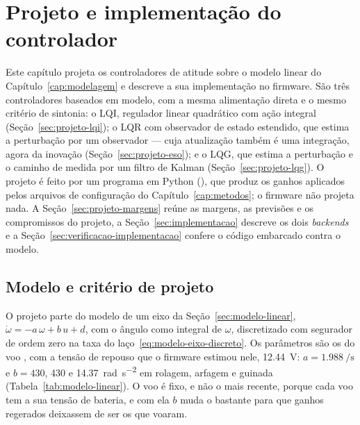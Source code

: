 %
\chapter{Projeto e implementação do controlador}
\label{cap:projeto}

Este capítulo projeta os controladores de atitude sobre o modelo linear do
Capítulo~\ref{cap:modelagem} e descreve a sua implementação no firmware. São
três controladores baseados em modelo, com a mesma alimentação direta e o
mesmo critério de sintonia: o LQI, regulador linear quadrático com ação
integral (Seção~\ref{sec:projeto-lqi}); o LQR com observador de estado
estendido, que estima a perturbação por um observador --- cuja atualização
também é uma integração, agora da inovação
(Seção~\ref{sec:projeto-eso}); e o LQG, que estima a perturbação e o caminho
de medida por um filtro de Kalman (Seção~\ref{sec:projeto-lqg}). O projeto é
feito por um programa em Python (), que produz
os ganhos aplicados pelos arquivos de configuração do
Capítulo~\ref{cap:metodos}; o firmware não projeta nada. A
Seção~\ref{sec:projeto-margens} reúne as margens, as previsões e os
compromissos do projeto, a Seção~\ref{sec:implementacao} descreve os dois
\textit{backends} e a Seção~\ref{sec:verificacao-implementacao} confere o
código embarcado contra o modelo.

\section{Modelo e critério de projeto}
\label{sec:projeto-modelo}

O projeto parte do modelo de um eixo da Seção~\ref{sec:modelo-linear},
$\dot\omega = -a\,\omega + b\,u + d$, com o ângulo como integral de $\omega$,
discretizado com segurador de ordem zero na taxa do
laço~\eqref{eq:modelo-eixo-discreto}. Os parâmetros são os do voo
, com a tensão de repouso que o
firmware estimou nele, \SI{12.44}{\volt}: $a = \SI{1.988}{\per\second}$ e
$b = 430$, 430 e \SI{14.37}{\radian\per\second\squared} em rolagem, arfagem e
guinada (Tabela~\ref{tab:modelo-linear}). O voo é fixo, e não o mais recente,
porque cada voo tem a sua tensão de bateria, e com ela $b$ muda o bastante
para que ganhos regerados deixassem de ser os que voaram.

